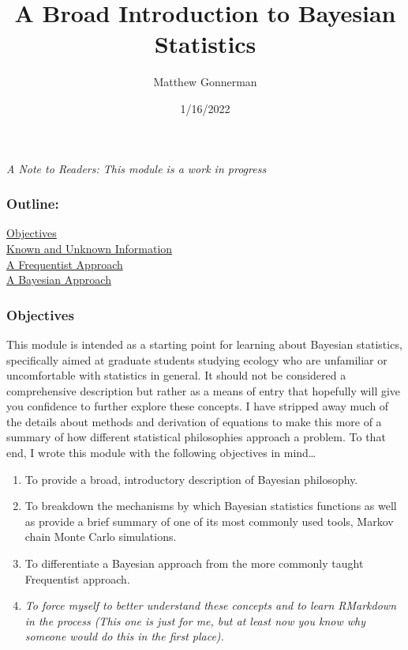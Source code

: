 \documentclass[
]{article}
\title{A Broad Introduction to Bayesian Statistics}
\author{Matthew Gonnerman}
\date{1/16/2022}
\providecommand{\tightlist}{%
  \setlength{\itemsep}{0pt}\setlength{\parskip}{0pt}}
\begin{document}
\maketitle

\emph{A Note to Readers: This module is a work in progress}

\hypertarget{outline}{%
\subsubsection{Outline:}\label{outline}}

\protect\hyperlink{objectives}{Objectives}\\
\protect\hyperlink{known-and-unknown-information}{Known and Unknown
Information}\\
\protect\hyperlink{a-frequentist-approach}{A Frequentist Approach}\\
\protect\hyperlink{a-bayesian-approach}{A Bayesian Approach}

\hypertarget{objectives}{%
\subsubsection{Objectives}\label{objectives}}

This module is intended as a starting point for learning about Bayesian
statistics, specifically aimed at graduate students studying ecology who
are unfamiliar or uncomfortable with statistics in general. It should
not be considered a comprehensive description but rather as a means of
entry that hopefully will give you confidence to further explore these
concepts. I have stripped away much of the details about methods and
derivation of equations to make this more of a summary of how different
statistical philosophies approach a problem. To that end, I wrote this
module with the following objectives in mind\ldots{}\\

\begin{enumerate}
\def\labelenumi{\arabic{enumi})}
\tightlist
\item
  To provide a broad, introductory description of Bayesian philosophy.\\
\item
  To breakdown the mechanisms by which Bayesian statistics functions as
  well as provide a brief summary of one of its most commonly used
  tools, Markov chain Monte Carlo simulations.\\
\item
  To differentiate a Bayesian approach from the more commonly taught
  Frequentist approach.\\
\item
  \emph{To force myself to better understand these concepts and to learn
  RMarkdown in the process (This one is just for me, but at least now
  you know why someone would do this in the first place).}
\end{enumerate}
\end{document}
